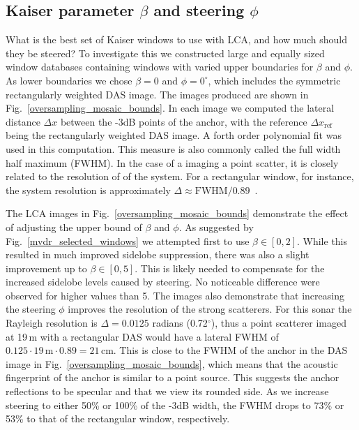 \documentclass[10pt,journal,draftclsnofoot,onecolumn]{IEEEtran}
\newcommand\Fig[1]{Fig.~\ref{#1}}
\newcommand\1{\vec 1}
\begin{document}
\subsection{Kaiser parameter $\beta$ and steering $\phi$}\label{sec:results_window_parameters}

What is the best set of Kaiser windows to use with LCA, and how much should they be steered? To investigate this we constructed large and equally sized window databases containing windows with varied upper boundaries for $\beta$ and $\phi$. As lower boundaries we chose $\beta=0$ and $\phi=0^\circ$, which includes the symmetric rectangularly weighted DAS image. The images produced are shown in \Fig{oversampling_mosaic_bounds}. In each image we computed the lateral distance $\Delta x$ between the -3dB points of the anchor, with the reference $\Delta x_\text{ref}$ being the rectangularly weighted DAS image. A forth order polynomial fit was used in this computation. This measure is also commonly called the full width half maximum (FWHM). In the case of a imaging a point scatter, it is closely related to the resolution of of the system. For a rectangular window, for instance, the system resolution is approximately $\Delta \approx \text{FWHM}/0.89$~\cite{Harris1978}.

The LCA images in \Fig{oversampling_mosaic_bounds} demonstrate the effect of adjusting the upper bound of $\beta$ and $\phi$. As suggested by \Fig{mvdr_selected_windows} we attempted first to use $\beta\in[0,2]$. While this resulted in much improved sidelobe suppression, there was also a slight improvement up to $\beta\in[0,5]$. This is likely needed to compensate for the increased sidelobe levels caused by steering. No noticeable difference were observed for higher values than 5. The images also demonstrate that increasing the steering $\phi$ improves the resolution of the strong scatterers. For this sonar the Rayleigh resolution is $\Delta=0.0125$ radians (0.72$^\circ$), thus a point scatterer imaged at 19\,m with a rectangular DAS would have a lateral FWHM of $0.125\cdot19\,\text{m}\cdot0.89=21\,\text{cm}$. This is close to the FWHM of the anchor in the DAS image in \Fig{oversampling_mosaic_bounds}, which means that the acoustic fingerprint of the anchor is similar to a point source. This suggests the anchor reflections to be specular and that we view its rounded side. As we increase steering to either 50\% or 100\% of the -3dB width, the FWHM drops to 73\% or 53\% to that of the rectangular window, respectively.
\end{document}

